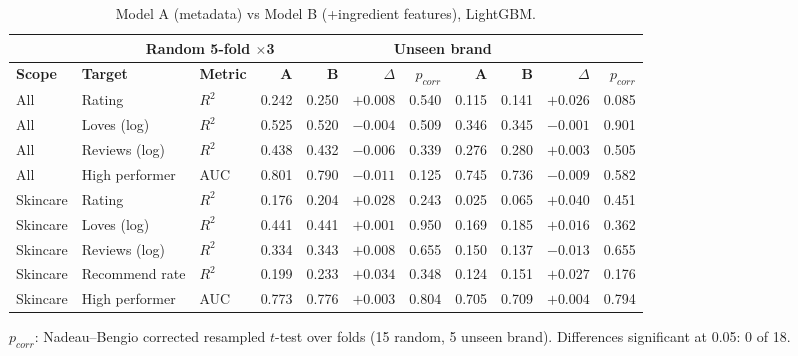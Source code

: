 \begin{table}[htbp]
\centering
\small
\begin{tabular}{|l|l|l|r|r|r|r|r|r|r|r|}
\hline
\rowcolor{headfill} \multicolumn{3}{|c|}{} & \multicolumn{4}{c|}{\textbf{Random 5-fold $\times$3}} & \multicolumn{4}{c|}{\textbf{Unseen brand}} \\
\hline
\rowcolor{headfill} \textbf{Scope} & \textbf{Target} & \textbf{Metric} & \textbf{A} & \textbf{B} & \textbf{$\Delta$} & \textbf{$p_{corr}$} & \textbf{A} & \textbf{B} & \textbf{$\Delta$} & \textbf{$p_{corr}$} \\
\hline
All & Rating & $R^2$ & 0.242 & 0.250 & $+0.008$ & 0.540 & 0.115 & 0.141 & $+0.026$ & 0.085 \\
\hline
All & Loves (log) & $R^2$ & 0.525 & 0.520 & $-0.004$ & 0.509 & 0.346 & 0.345 & $-0.001$ & 0.901 \\
\hline
All & Reviews (log) & $R^2$ & 0.438 & 0.432 & $-0.006$ & 0.339 & 0.276 & 0.280 & $+0.003$ & 0.505 \\
\hline
All & High performer & AUC & 0.801 & 0.790 & $-0.011$ & 0.125 & 0.745 & 0.736 & $-0.009$ & 0.582 \\
\hline
\hline
Skincare & Rating & $R^2$ & 0.176 & 0.204 & $+0.028$ & 0.243 & 0.025 & 0.065 & $+0.040$ & 0.451 \\
\hline
Skincare & Loves (log) & $R^2$ & 0.441 & 0.441 & $+0.001$ & 0.950 & 0.169 & 0.185 & $+0.016$ & 0.362 \\
\hline
Skincare & Reviews (log) & $R^2$ & 0.334 & 0.343 & $+0.008$ & 0.655 & 0.150 & 0.137 & $-0.013$ & 0.655 \\
\hline
Skincare & Recommend rate & $R^2$ & 0.199 & 0.233 & $+0.034$ & 0.348 & 0.124 & 0.151 & $+0.027$ & 0.176 \\
\hline
Skincare & High performer & AUC & 0.773 & 0.776 & $+0.003$ & 0.804 & 0.705 & 0.709 & $+0.004$ & 0.794 \\
\hline
\end{tabular}
\par\smallskip
\parbox{0.95\linewidth}{\footnotesize $p_{corr}$: Nadeau--Bengio corrected resampled $t$-test over folds (15 random, 5 unseen brand). Differences significant at 0.05: 0 of 18.}
\caption{Model A (metadata) vs Model B (+ingredient features), LightGBM.}
\label{tab:models}
\end{table}
